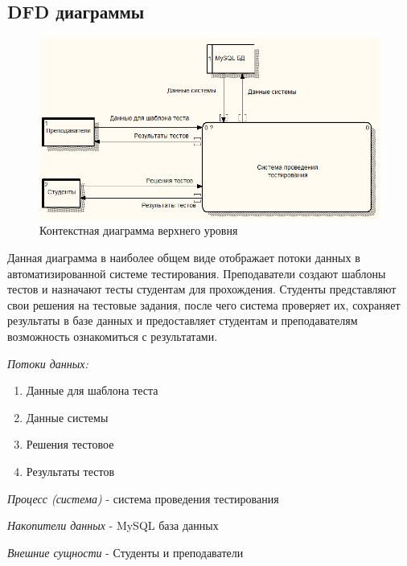 \subsection{DFD диаграммы}
\begin{figure}[H]
    \includegraphics[width=\textwidth, center]{../img/dfd/context.png}
    \caption{Контекстная диаграмма верхнего уровня}
\end{figure}

Данная диаграмма в наиболее общем виде отображает потоки данных в автоматизированной
системе тестирования. Преподаватели создают шаблоны тестов и назначают тесты студентам
для прохождения. Студенты представляют свои решения на тестовые задания, после чего
система проверяет их, сохраняет результаты в базе данных и предоставляет студентам
и преподавателям возможность ознакомиться с результатами.

\textit{Потоки данных:}
\begin{enumerate}
    \item Данные для шаблона теста
    \item Данные системы
    \item Решения тестовое
    \item Результаты тестов
\end{enumerate}

\textit{Процесс (система)} - система проведения тестирования

\textit{Накопители данных} - MySQL база данных

\textit{Внешние сущности} - Студенты и преподаватели

